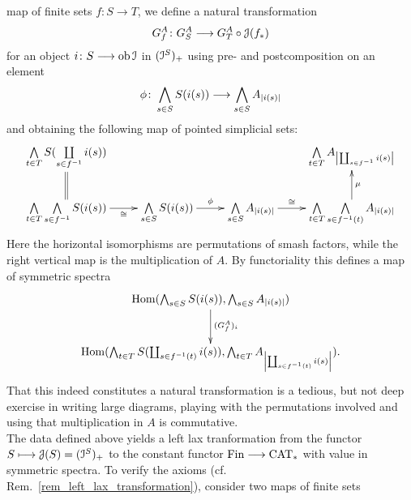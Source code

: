 \begin{defn}
    map of finite sets $f \colon S \to T$, we define a natural transformation
    \begin{displaymath}
      G^A_f \colon G^A_S \longrightarrow G^A_T \circ \mathcal{J}(f_*)
    \end{displaymath}
    for an object $i \colon S \longrightarrow \operatorname{ob} \mathcal{I}$ in $(\mathcal{I}^S)_+$ using pre- and postcomposition on an element
    \begin{displaymath}
      \phi \colon \bigwedge_{s \in S} S(i(s)) \longrightarrow \bigwedge_{s \in S} A_{\left\vert i(s)\right\vert}
    \end{displaymath}
    and obtaining the following map of pointed simplicial sets:
    \begin{displaymath}
      \xymatrix{
        \bigwedge\limits_{t \in T} S(\coprod\limits_{s \in f^{-1}} i(s)) &&&
        \bigwedge\limits_{t \in T} A_{\abs{\coprod_{s \in f^{-1}} i(s)}}
        \\
        \bigwedge\limits_{t \in T} \bigwedge\limits_{s \in f^{-1}} S(i(s))
          \ar@{=}[u]
          \ar[r]_-{\cong}
        &
        \bigwedge\limits_{s \in S} S(i(s))
          \ar[r]^-{\phi}
        &
        \bigwedge\limits_{s \in S} A_{\abs{i(s)}}
          \ar[r]^-{\cong}
        &
        \bigwedge\limits_{t \in T} \bigwedge\limits_{s \in f^{-1}(t)} A_{\abs{i(s)}}
          \ar[u]_-{\mu}
      }
    \end{displaymath}
    Here the horizontal isomorphisms are permutations of smash factors, while
    the right vertical map is the multiplication of $A$. By functoriality this
    defines a map of symmetric spectra
    \begin{displaymath}
      \xymatrix{
        \Hom(\bigwedge_{s \in S} S(i(s)), 
        \bigwedge_{s \in S} A_{\abs{i(s)}}) \ar[d]^{(G^A_f)_i} \\%
        \Hom(\bigwedge_{t \in T} S(\coprod\nolimits_{s \in f^{-1}(t)} i(s)), %
          \bigwedge_{t \in T} A_{\abs{ \coprod_{s \in f^{-1}(t)} i(s)}}).
        }
    \end{displaymath}
    That this indeed constitutes a natural transformation is a tedious, but
    not deep exercise in writing large diagrams, playing with the permutations
    involved and using that multiplication in $A$ is commutative.\\ The data
    defined above yields a left lax tranformation from the functor $S \longmapsto
    \mathcal{J}(S) = (\mathcal{I}^S)_+$ to the constant functor $\mathrm{Fin} \longrightarrow \mathrm{CAT}_*$ with value
    in symmetric spectra.  To verify the axioms (cf.
    Rem.~\ref{rem_left_lax_transformation}), consider two maps of finite sets
    \begin{displaymath}

\end{displaymath}
\end{defn}
